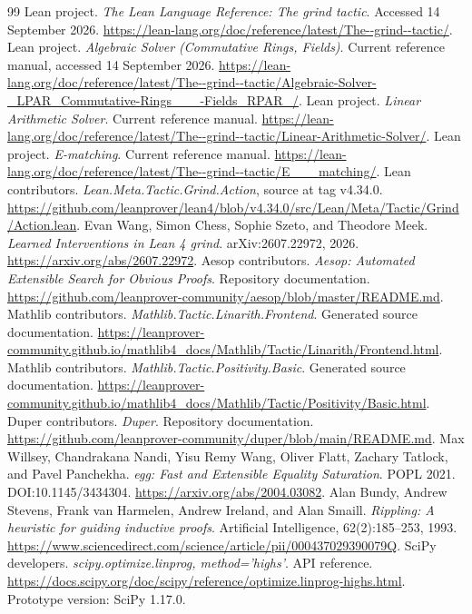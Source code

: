 \documentclass[11pt,a4paper]{article}
\begin{document}
\begin{thebibliography}{99}\small
{} Lean project. \emph{The Lean Language Reference: The grind tactic}. Accessed 14 September 2026. \url{https://lean-lang.org/doc/reference/latest/The--grind--tactic/}.
 Lean project. \emph{Algebraic Solver (Commutative Rings, Fields)}. Current reference manual, accessed 14 September 2026. \url{https://lean-lang.org/doc/reference/latest/The--grind--tactic/Algebraic-Solver-_LPAR_Commutative-Rings___-Fields_RPAR_/}.
 Lean project. \emph{Linear Arithmetic Solver}. Current reference manual. \url{https://lean-lang.org/doc/reference/latest/The--grind--tactic/Linear-Arithmetic-Solver/}.
 Lean project. \emph{E-matching}. Current reference manual. \url{https://lean-lang.org/doc/reference/latest/The--grind--tactic/E___matching/}.
 Lean contributors. \emph{Lean.Meta.Tactic.Grind.Action}, source at tag v4.34.0. \url{https://github.com/leanprover/lean4/blob/v4.34.0/src/Lean/Meta/Tactic/Grind/Action.lean}.
 Evan Wang, Simon Chess, Sophie Szeto, and Theodore Meek. \emph{Learned Interventions in Lean 4 grind}. arXiv:2607.22972, 2026. \url{https://arxiv.org/abs/2607.22972}.
 Aesop contributors. \emph{Aesop: Automated Extensible Search for Obvious Proofs}. Repository documentation. \url{https://github.com/leanprover-community/aesop/blob/master/README.md}.
 Mathlib contributors. \emph{Mathlib.Tactic.Linarith.Frontend}. Generated source documentation. \url{https://leanprover-community.github.io/mathlib4_docs/Mathlib/Tactic/Linarith/Frontend.html}.
 Mathlib contributors. \emph{Mathlib.Tactic.Positivity.Basic}. Generated source documentation. \url{https://leanprover-community.github.io/mathlib4_docs/Mathlib/Tactic/Positivity/Basic.html}.
 Duper contributors. \emph{Duper}. Repository documentation. \url{https://github.com/leanprover-community/duper/blob/main/README.md}.
 Max Willsey, Chandrakana Nandi, Yisu Remy Wang, Oliver Flatt, Zachary Tatlock, and Pavel Panchekha. \emph{egg: Fast and Extensible Equality Saturation}. POPL 2021. DOI:10.1145/3434304. \url{https://arxiv.org/abs/2004.03082}.
 Alan Bundy, Andrew Stevens, Frank van Harmelen, Andrew Ireland, and Alan Smaill. \emph{Rippling: A heuristic for guiding inductive proofs}. Artificial Intelligence, 62(2):185--253, 1993. \url{https://www.sciencedirect.com/science/article/pii/000437029390079Q}.
 SciPy developers. \emph{scipy.optimize.linprog, method='highs'}. API reference. \url{https://docs.scipy.org/doc/scipy/reference/optimize.linprog-highs.html}. Prototype version: SciPy 1.17.0.

\end{thebibliography}
\end{document}
